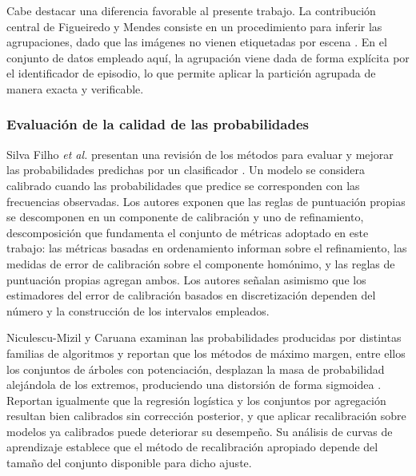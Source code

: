 
Cabe destacar una diferencia favorable al presente trabajo. La
contribución central de Figueiredo y Mendes consiste en un procedimiento
para inferir las agrupaciones, dado que las imágenes no vienen etiquetadas
por escena \cite{figueiredo_leakage_2024}. En el conjunto de datos
empleado aquí, la agrupación viene dada de forma explícita por el
identificador de episodio, lo que permite aplicar la partición agrupada de
manera exacta y verificable.

\subsubsection{Evaluación de la calidad de las probabilidades}

Silva Filho \textit{et al.} presentan una revisión de los métodos para
evaluar y mejorar las probabilidades predichas por un clasificador
\cite{silvafilho_calibration_2023}. Un modelo se considera calibrado
cuando las probabilidades que predice se corresponden con las frecuencias
observadas. Los autores exponen que las reglas de puntuación propias se
descomponen en un componente de calibración y uno de refinamiento,
descomposición que fundamenta el conjunto de métricas adoptado en este
trabajo: las métricas basadas en ordenamiento informan sobre el
refinamiento, las medidas de error de calibración sobre el componente
homónimo, y las reglas de puntuación propias agregan ambos. Los autores
señalan asimismo que los estimadores del error de calibración basados en
discretización dependen del número y la construcción de los intervalos
empleados.

Niculescu-Mizil y Caruana examinan las probabilidades producidas por
distintas familias de algoritmos y reportan que los métodos de máximo
margen, entre ellos los conjuntos de árboles con potenciación, desplazan la
masa de probabilidad alejándola de los extremos, produciendo una distorsión
de forma sigmoidea \cite{niculescumizil_probabilities_2005}. Reportan
igualmente que la regresión logística y los conjuntos por agregación
resultan bien calibrados sin corrección posterior, y que aplicar
recalibración sobre modelos ya calibrados puede deteriorar su desempeño.
Su análisis de curvas de aprendizaje establece que el método de
recalibración apropiado depende del tamaño del conjunto disponible para
dicho ajuste.

